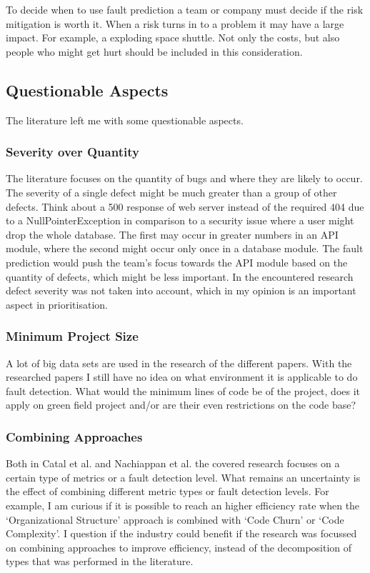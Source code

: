 To decide when to use fault prediction a team or company must decide if the risk mitigation is worth it.
When a risk turns in to a problem it may have a large impact. For example, a exploding space shuttle.
Not only the costs, but also people who might get hurt should be included in this consideration.

\subsection*{Questionable Aspects}

The literature left me with some questionable aspects.

\subsubsection*{Severity over Quantity}

The literature focuses on the quantity of bugs and where they are likely to occur.
The severity of a single defect might be much greater than a group of other defects.
Think about a 500 response of web server instead of the required 404 due to a NullPointerException in comparison to a security issue where a user might drop the whole database.
The first may occur in greater numbers in an API module, where the second might occur only once in a database module.
The fault prediction would push the team's focus towards the API module based on the quantity of defects, which might be less important.
In the encountered research defect severity was not taken into account, which in my opinion is an important aspect in prioritisation.

\subsubsection*{Minimum Project Size}

A lot of big data sets are used in the research of the different papers.
With the researched papers I still have no idea on what environment it is applicable to do fault detection.
What would the minimum lines of code be of the project, does it apply on green field project and/or are their even restrictions on the code base?

\subsubsection*{Combining Approaches}

Both in Catal et al. \autocite{Catal20097346} and Nachiappan et al. \autocite{MAKING_SOFTWARE}
the covered research focuses on a certain type of metrics or a fault detection level.
What remains an uncertainty is the effect of combining different metric types or fault detection levels.
For example, I am curious if it is possible to reach an higher efficiency rate when the `Organizational Structure' approach is combined with `Code Churn' or `Code Complexity'.
I question if the industry could benefit if the research was focussed on combining approaches to improve efficiency, instead of the decomposition of types that was performed in the literature.

